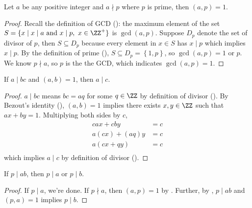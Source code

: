 \begin{lemma}\label{prime_coprime_with_nondiv_int}
    Let $a$ be any positive integer and $a\nmid p$ where $p$ is prime, then $(a,p)=1$.
\end{lemma}
\begin{proof}
    Recall the definition of GCD (): the maximum element of the set $S = \{ x \mid x \mid a \text{ and } x \mid p ,\  x \in \ZZ^+ \}$ is $\gcd(a,p)$. Suppose $D_p$ denote the set of divisor of $p$, then $S\subseteq D_p$ because every element in $x\in S$ has $x\mid p$ which implies $x\mid p$. By the definition of prime (), $S\subseteq D_p=\left\{1,p\right\}$, so $\gcd(a,p)=1 \text{ or } p$. We know $p\nmid a$, so $p$ is the the GCD, which indicates $\gcd(a,p)=1$.
\end{proof}

\begin{theorem}\label{coprime_imply_division}
    If $a\mid bc$ and $(a,b)=1$, then $a\mid c$.
\end{theorem}
\begin{proof}
    $a\mid bc$ means $bc=aq$ for some $q\in\ZZ$ by definition of divisor (). By Bezout's identity (), $(a,b)=1$ implies there exists $x,y\in\ZZ$ such that $ax+by=1$. Multiplying both sides by $c$, 
    \begin{equation*}
        \begin{aligned}
            cax+cby&=c\\
            a(cx)+(aq)y&=c\\
            a(cx+qy)&=c\\
        \end{aligned}
    \end{equation*}
    which implies $a\mid c$ by definition of divisor ().
\end{proof}

\begin{theorem}\label{euclid-lemma}
    If $p\mid ab$, then $p\mid a$ or $p\mid b$.
\end{theorem}
\begin{proof}
    If $p\mid a$, we're done. If $p\nmid a$, then $(a,p)=1$ by . Further, by , $p\mid ab$ and $(p,a)=1$ implies $p\mid b$. 
\end{proof}

